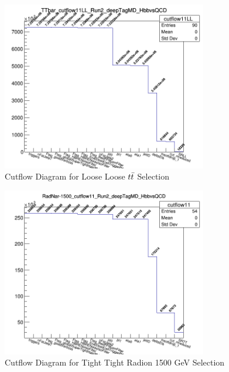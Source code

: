\begin{figure}[!htb]
	\centering
    \includegraphics[width=0.8\textwidth]{Figures/ttbar_cutflow11LL_Run2_deepTagMD_HbbvsQCD.png}
	\caption{Cutflow Diagram for Loose Loose $t\bar{t} $ Selection}
	\label{fig:11CutflowttLL}
\end{figure}
\begin{figure}[!htb]
	\centering
    \includegraphics[width=0.8\textwidth]{Figures/radnar1500_cutflow11_Run2_deepTagMD_HbbvsQCD.png}
	\caption{Cutflow Diagram for Tight Tight Radion 1500 GeV Selection}
	\label{fig:11CutflowsigTT}
\end{figure}

